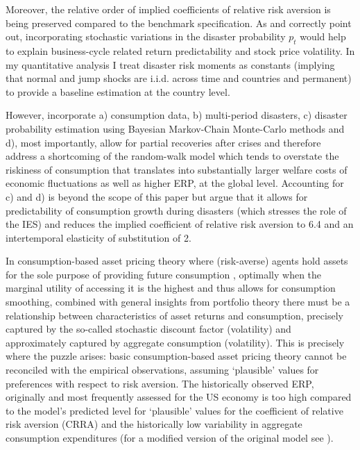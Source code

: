 Moreover, the relative order of implied coefficients of relative risk aversion is being preserved compared to the benchmark specification. 
As \citet{Barro2006} and \citet{Cochrane2017} correctly point out, incorporating stochastic variations in the disaster probability $p_{t}$ would help to explain business-cycle related return predictability and stock price volatility. In my quantitative analysis I treat disaster risk moments as constants (implying that normal and jump shocks are i.i.d. across time and countries and permanent) to provide a baseline estimation at the country level. 

However, \citet{Nakamura2013} incorporate a) consumption data, b) multi-period disasters, c) disaster probability estimation using Bayesian Markov-Chain Monte-Carlo methods and d), most importantly, allow for partial recoveries after crises and therefore address a shortcoming of the \cite{Barro2006} random-walk model which tends to overstate the riskiness of consumption that translates into substantially larger welfare costs of economic fluctuations \cite{Barro2009} as well as higher ERP, at the global level. Accounting for c) and d) is beyond the scope of this paper but \citet{Nakamura2013} argue that it allows for predictability of consumption growth during disasters (which stresses the role of the IES) and reduces the implied coefficient of relative risk aversion to 6.4 and an intertemporal elasticity of substitution of 2.

In consumption-based asset pricing theory where (risk-averse) agents hold assets for the sole purpose of providing future consumption \cite{Abel1991}, optimally when the marginal utility of accessing it is the highest and thus allows for consumption smoothing, combined with general insights from portfolio theory \cite{Markowitz1952} there must be a relationship between characteristics of asset returns and consumption, precisely captured by the so-called stochastic discount factor (volatility) and approximately captured by aggregate consumption (volatility). This is precisely where the puzzle arises: basic consumption-based asset pricing theory cannot be reconciled with the empirical observations, assuming `plausible' values for preferences with respect to risk aversion. The historically observed ERP, originally and most frequently assessed for the US economy \cite{Mehra1985, Cecchetti1993} is too high compared to the model's predicted level for `plausible' values for the coefficient of relative risk aversion (CRRA) and the historically low variability in aggregate consumption expenditures (for a modified version of the original model see \citet{Mehra2003}). 

